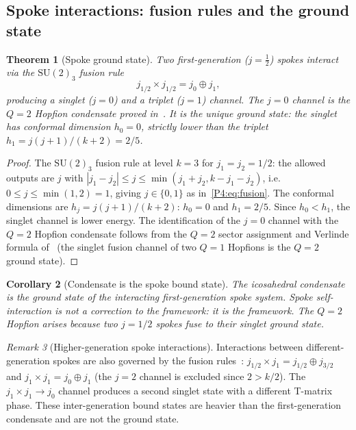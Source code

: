 \documentclass[11pt,a4paper]{article}
\newtheorem{theorem}{Theorem}[section]
\newtheorem{corollary}[theorem]{Corollary}
\theoremstyle{definition}
\theoremstyle{remark}
\newtheorem{remark}[theorem]{Remark}
\begin{document}
\subsection{Spoke interactions: fusion rules and the ground state}
\label{P4:sec:spoke_interactions}

\begin{theorem}[Spoke ground state]
\label{P4:thm:spoke_ground}
Two first-generation ($j=\tfrac{1}{2}$) spokes interact via the
$\mathrm{SU}(2)_3$ fusion rule~\cite{Verlinde1988}
\begin{equation}
  j_{1/2} \times j_{1/2} = j_0 \oplus j_1,
  \label{P4:eq:fusion}
\end{equation}
producing a singlet ($j=0$) and a triplet ($j=1$) channel.
The $j=0$ channel is the $Q=2$ Hopfion condensate proved in~\cite{Paper3}.
It is the unique ground state: the singlet has conformal dimension
$h_0 = 0$, strictly lower than the triplet $h_1 = j(j+1)/(k+2) = 2/5$.
\end{theorem}

\begin{proof}
The $\mathrm{SU}(2)_3$ fusion rule at level $k=3$ for $j_1=j_2=1/2$:
the allowed outputs are $j$ with $|j_1-j_2|\leq j\leq \min(j_1+j_2,k-j_1-j_2)$,
i.e.\ $0\leq j\leq\min(1,2)=1$, giving $j\in\{0,1\}$ as in~\eqref{P4:eq:fusion}.
The conformal dimensions are $h_j = j(j+1)/(k+2)$: $h_0=0$ and $h_1=2/5$.
Since $h_0<h_1$, the singlet channel is lower energy.
The identification of the $j=0$ channel with the $Q=2$ Hopfion condensate
follows from the $Q=2$ sector assignment and Verlinde formula of~\cite{Paper3}
(the singlet fusion channel of two $Q=1$ Hopfions is the $Q=2$ ground state).
\end{proof}

\begin{corollary}[Condensate is the spoke bound state]
\label{P4:cor:spoke_bound_state}
The icosahedral condensate is the ground state of the interacting
first-generation spoke system.  Spoke self-interaction is not a
correction to the framework: it \emph{is} the framework.  The $Q=2$
Hopfion arises because two $j=1/2$ spokes fuse to their singlet ground state.
\end{corollary}

\begin{remark}[Higher-generation spoke interactions]
\label{P4:rem:higher_gen_interactions}
Interactions between different-generation spokes are also governed by
the fusion rules~\cite{Verlinde1988}:
$j_{1/2}\times j_1 = j_{1/2}\oplus j_{3/2}$ and
$j_1\times j_1 = j_0\oplus j_1$ (the $j=2$ channel is excluded since $2>k/2$).
The $j_1\times j_1\to j_0$ channel produces a second singlet state with a
different T-matrix phase.  These inter-generation bound states are heavier
than the first-generation condensate and are not the ground state.
\end{remark}
\end{document}
